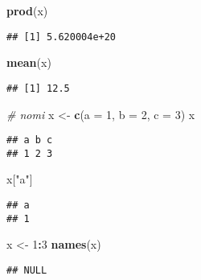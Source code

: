 \documentclass[
]{article}
\newenvironment{Shaded}{\begin{snugshade}}{\end{snugshade}}
\newcommand{\AttributeTok}[1]{\textcolor[rgb]{0.13,0.29,0.53}{#1}}
\newcommand{\CommentTok}[1]{\textcolor[rgb]{0.56,0.35,0.01}{\textit{#1}}}
\newcommand{\DecValTok}[1]{\textcolor[rgb]{0.00,0.00,0.81}{#1}}
\newcommand{\FunctionTok}[1]{\textcolor[rgb]{0.13,0.29,0.53}{\textbf{#1}}}
\newcommand{\NormalTok}[1]{#1}
\newcommand{\OtherTok}[1]{\textcolor[rgb]{0.56,0.35,0.01}{#1}}
\newcommand{\SpecialCharTok}[1]{\textcolor[rgb]{0.81,0.36,0.00}{\textbf{#1}}}
\newcommand{\StringTok}[1]{\textcolor[rgb]{0.31,0.60,0.02}{#1}}
\begin{document}
\begin{Shaded}
\begin{Highlighting}[]
\FunctionTok{prod}\NormalTok{(x)}
\end{Highlighting}
\end{Shaded}

\begin{verbatim}
## [1] 5.620004e+20
\end{verbatim}

\begin{Shaded}
\begin{Highlighting}[]
\FunctionTok{mean}\NormalTok{(x)}
\end{Highlighting}
\end{Shaded}

\begin{verbatim}
## [1] 12.5
\end{verbatim}

\begin{Shaded}
\begin{Highlighting}[]
\CommentTok{\# nomi}
\NormalTok{x }\OtherTok{\textless{}{-}} \FunctionTok{c}\NormalTok{(}\AttributeTok{a =} \DecValTok{1}\NormalTok{, }\AttributeTok{b =} \DecValTok{2}\NormalTok{, }\AttributeTok{c =} \DecValTok{3}\NormalTok{)}
\NormalTok{x}
\end{Highlighting}
\end{Shaded}

\begin{verbatim}
## a b c 
## 1 2 3
\end{verbatim}

\begin{Shaded}
\begin{Highlighting}[]
\NormalTok{x[}\StringTok{"a"}\NormalTok{]}
\end{Highlighting}
\end{Shaded}

\begin{verbatim}
## a 
## 1
\end{verbatim}

\begin{Shaded}
\begin{Highlighting}[]
\NormalTok{x }\OtherTok{\textless{}{-}} \DecValTok{1}\SpecialCharTok{:}\DecValTok{3}
\FunctionTok{names}\NormalTok{(x)}
\end{Highlighting}
\end{Shaded}

\begin{verbatim}
## NULL
\end{verbatim}
\end{document}

